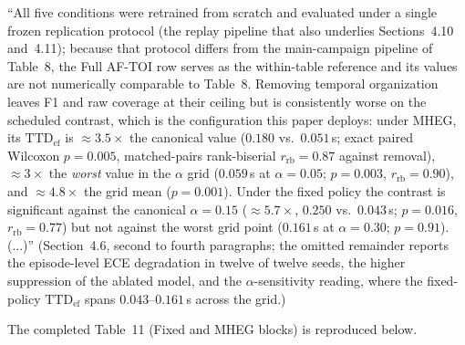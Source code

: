 \documentclass[1p,12pt,authoryear]{elsarticle}
\begin{document}
``All five conditions were retrained from scratch and evaluated under a single frozen replication protocol (the replay pipeline that also underlies Sections~4.10 and~4.11); because that protocol differs from the main-campaign pipeline of Table~8, the Full AF-TOI row serves as the within-table reference and its values are not numerically comparable to Table~8. Removing temporal organization leaves F1 and raw coverage at their ceiling but is consistently worse on the scheduled contrast, which is the configuration this paper deploys: under MHEG, its $\mathrm{TTD}_{\mathrm{ef}}$ is ${\approx}3.5\times$ the canonical value ($0.180$ vs.\ $0.051$\,s; exact paired Wilcoxon $p=0.005$, matched-pairs rank-biserial $r_{\mathrm{rb}}=0.87$ against removal), ${\approx}3\times$ the \emph{worst} value in the $\alpha$ grid ($0.059$\,s at $\alpha=0.05$; $p=0.003$, $r_{\mathrm{rb}}=0.90$), and ${\approx}4.8\times$ the grid mean ($p=0.001$). Under the fixed policy the contrast is significant against the canonical $\alpha=0.15$ (${\approx}5.7\times$, $0.250$ vs.\ $0.043$\,s; $p=0.016$, $r_{\mathrm{rb}}=0.77$) but not against the worst grid point ($0.161$\,s at $\alpha=0.30$; $p=0.91$). (...)'' (Section~4.6, second to fourth paragraphs; the omitted remainder reports the episode-level ECE degradation in twelve of twelve seeds, the higher suppression of the ablated model, and the $\alpha$-sensitivity reading, where the fixed-policy $\mathrm{TTD}_{\mathrm{ef}}$ spans $0.043$--$0.161$\,s across the grid.)

\noindent The completed Table~11 (Fixed and MHEG blocks) is reproduced below.
\end{document}
